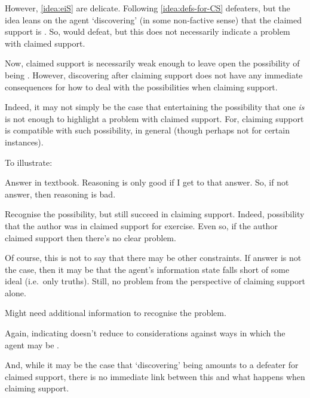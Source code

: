 \begin{note}
  However, \autoref{idea:eiS} are delicate.
  Following \autoref{idea:defs-for-CS} defeaters, but the idea leans on the agent `discovering' (in some non-factive sense) that the claimed support is \mom{}.
  So, would defeat, but this does not necessarily indicate a problem with claimed support.

  Now, claimed support is necessarily weak enough to leave open the possibility of being \mom{}.
  However, discovering after claiming support does not have any immediate consequences for how to deal with the possibilities when claiming support.

  Indeed, it may not simply be the case that entertaining the possibility that one \emph{is} \mom{} is not enough to highlight a problem with claimed support.
  For, claiming support is compatible with such possibility, in general (though perhaps not for certain instances).

  To illustrate:

  \begin{illustration}
    Answer in textbook.
    Reasoning is only good if I get to that answer.
    So, if not answer, then reasoning is bad.
  \end{illustration}

  Recognise the possibility, but still succeed in claiming support.
  Indeed, possibility that the author was \mom{} in claimed support for exercise.
  Even so, if the author claimed support then there's no clear problem.

  Of course, this is not to say that there may be other constraints.
  If answer is not the case, then it may be that the agent's information state falls short of some ideal (i.e.\ only truths).
  Still, no problem from the perspective of claiming support alone.

  Might need additional information to recognise the problem.

  Again, indicating doesn't reduce to considerations against ways in which the agent may be \mom{}.

  And, while it may be the case that `discovering' being \mom{} amounts to a defeater for claimed support, there is no immediate link between this and what happens when claiming support.
\end{note}

